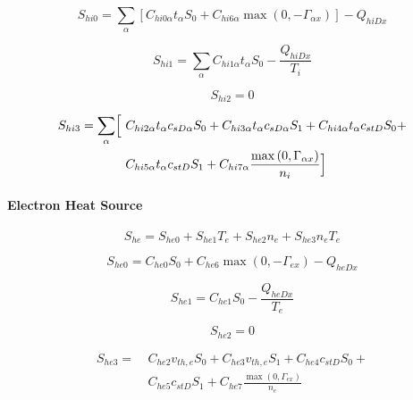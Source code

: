\documentclass[a4paper,10pt]{report}
\begin{document}
\begin{equation}
S_{hi0}=\sum_{\alpha}\left[ C_{hi0\alpha}t_{\alpha}S_{0}+C_{hi6\alpha}
\max\left( 0,-\Gamma_{\alpha x}\right) \right] -Q_{hiDx}   \label{99}
\end{equation}

\begin{equation}
S_{hi1}=\sum_{\alpha}C_{hi1\alpha}t_{\alpha}S_{0}-\frac{Q_{hiDx}}{T_{i}}   \label{100}
\end{equation}

\begin{equation}
S_{hi2}=0   \label{101}
\end{equation}

\begin{equation}\begin{split}
S_{hi3}=\sum_{\alpha}\Bigl[ ~ & C_{hi2\alpha}t_{\alpha}c_{sD\alpha}S_{0}+C_{hi3\alpha}
t_{\alpha}c_{sD\alpha}S_{1}+C_{hi4\alpha}t_{\alpha}c_{stD}S_{0}+ \\
~ & C_{hi5\alpha}t_{\alpha}c_{stD}S_{1}+C_{hi7\alpha}
\frac{\max\left(0,\Gamma_{\alpha x}\right) }{n_{i}}\Bigr]   \label{102}
\end{split}\end{equation}

\paragraph{\protect\bigskip Electron Heat Source}

\begin{equation}
S_{he}=S_{he0}+S_{he1}T_{e}+S_{he2}n_{e}+S_{he3}n_{e}T_{e}   \label{103}
\end{equation}

\begin{equation}
S_{he0}=C_{he0}S_{0}+C_{he6}\max\left( 0,-\Gamma_{ex}\right) -Q_{heDx}
\label{104}
\end{equation}

\begin{equation}
S_{he1}=C_{he1}S_{0}-\frac{Q_{heDx}}{T_{e}}   \label{105}
\end{equation}

\begin{equation}
S_{he2}=0   \label{106}
\end{equation}

\begin{equation}\begin{split}
S_{he3} =~ & C_{he2}v_{th,e}S_{0}+C_{he3}v_{th,e}S_{1}+C_{he4}c_{stD}S_{0}+ \\
~ & C_{he5}c_{stD}S_{1}+C_{he7}\frac{\max\left( 0,\Gamma_{ex}\right) }{n_{e}}
\label{107}
\end{split}\end{equation}
\end{document}
